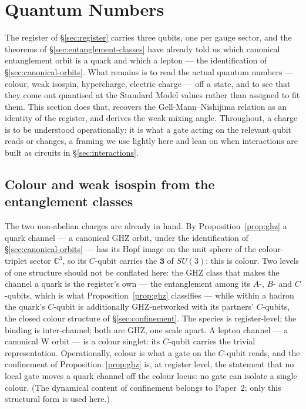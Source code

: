 \section{Quantum Numbers}
\label{sec:charges}

The register of \S\ref{sec:register} carries three qubits, one per gauge sector, and the theorems
of \S\ref{sec:entanglement-classes} have already told us which canonical entanglement orbit is a
quark and which a lepton --- the identification of \S\ref{sec:canonical-orbits}. What remains is to
read the actual quantum numbers --- colour, weak isospin,
hypercharge, electric charge --- off a state, and to see that they come out quantised at the
Standard Model values rather than assigned to fit them. This section does that, recovers the
Gell-Mann--Nishijima relation as an identity of the register, and derives the weak mixing angle.
Throughout, a charge is to be understood operationally: it is what a gate acting on the relevant
qubit reads or changes, a framing we use lightly here and lean on when interactions are built as
circuits in \S\ref{sec:interactions}.

\subsection{Colour and weak isospin from the entanglement classes}

The two non-abelian charges are already in hand. By Proposition~\ref{prop:ghz} a quark channel ---
a canonical GHZ orbit, under the identification of \S\ref{sec:canonical-orbits} --- has its Hopf
image on the unit sphere of the colour-triplet sector $\mathbb{C}^3$, so its $C$-qubit carries the
$\mathbf{3}$ of $SU(3)$: this is colour. Two levels of one structure should not be conflated
here: the GHZ class that makes the channel a quark is the register's own --- the entanglement among
its $A$-, $B$- and $C$-qubits, which is what Proposition~\ref{prop:ghz} classifies --- while within
a hadron the quark's $C$-qubit is additionally GHZ-networked with its partners' $C$-qubits, the
closed colour structure of \S\ref{sec:confinement}. The species is register-level; the binding is
inter-channel; both are GHZ, one scale apart. A lepton channel --- a canonical W orbit --- is a colour singlet:
its $C$-qubit carries the trivial representation. Operationally, colour is what a gate on the
$C$-qubit reads, and the confinement of Proposition~\ref{prop:ghz} is, at register level, the
statement that no local gate moves a quark channel off the colour locus: no gate can isolate a
single colour. (The dynamical content of confinement belongs to Paper~2; only this structural form
is used here.)

